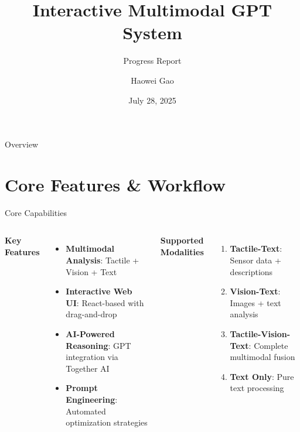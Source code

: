 \documentclass[aspectratio=169,xcolor=dvipsnames]{beamer}
\title{Interactive Multimodal GPT System}
\subtitle{Progress Report}
\author{Haowei Gao}
\institute
{
    Department of Bioengineering
}
\date{July 28, 2025}
\begin{document}
\begin{frame}
    \titlepage
\end{frame}

\begin{frame}{Overview}
    \tableofcontents
\end{frame}

\section{Core Features \& Workflow}

\begin{frame}{Core Capabilities}
    \begin{columns}[c]
        \textbf{Key Features}
        \begin{itemize}
            \item \textbf{Multimodal Analysis}: Tactile + Vision + Text
            \item \textbf{Interactive Web UI}: React-based with drag-and-drop
            \item \textbf{AI-Powered Reasoning}: GPT integration via Together AI
            \item \textbf{Prompt Engineering}: Automated optimization strategies
        \end{itemize}

        \textbf{Supported Modalities}
        \begin{enumerate}
            \item \textbf{Tactile-Text}: Sensor data + descriptions
            \item \textbf{Vision-Text}: Images + text analysis
            \item \textbf{Tactile-Vision-Text}: Complete multimodal fusion
            \item \textbf{Text Only}: Pure text processing
        \end{enumerate}
    \end{columns}
\end{frame}
\end{document}
